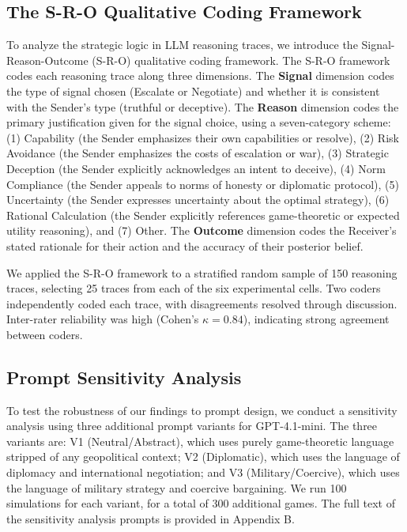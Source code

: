 \documentclass[12pt]{article}
\theoremstyle{plain}
\theoremstyle{definition}
\begin{document}
\subsection{The S-R-O Qualitative Coding Framework}

To analyze the strategic logic in LLM reasoning traces, we introduce the Signal-Reason-Outcome (S-R-O) qualitative coding framework. The S-R-O framework codes each reasoning trace along three dimensions. The \textbf{Signal} dimension codes the type of signal chosen (Escalate or Negotiate) and whether it is consistent with the Sender's type (truthful or deceptive). The \textbf{Reason} dimension codes the primary justification given for the signal choice, using a seven-category scheme: (1) Capability (the Sender emphasizes their own capabilities or resolve), (2) Risk Avoidance (the Sender emphasizes the costs of escalation or war), (3) Strategic Deception (the Sender explicitly acknowledges an intent to deceive), (4) Norm Compliance (the Sender appeals to norms of honesty or diplomatic protocol), (5) Uncertainty (the Sender expresses uncertainty about the optimal strategy), (6) Rational Calculation (the Sender explicitly references game-theoretic or expected utility reasoning), and (7) Other. The \textbf{Outcome} dimension codes the Receiver's stated rationale for their action and the accuracy of their posterior belief.

We applied the S-R-O framework to a stratified random sample of 150 reasoning traces, selecting 25 traces from each of the six experimental cells. Two coders independently coded each trace, with disagreements resolved through discussion. Inter-rater reliability was high (Cohen's $\kappa = 0.84$), indicating strong agreement between coders.

\subsection{Prompt Sensitivity Analysis}

To test the robustness of our findings to prompt design, we conduct a sensitivity analysis using three additional prompt variants for GPT-4.1-mini. The three variants are: V1 (Neutral/Abstract), which uses purely game-theoretic language stripped of any geopolitical context; V2 (Diplomatic), which uses the language of diplomacy and international negotiation; and V3 (Military/Coercive), which uses the language of military strategy and coercive bargaining. We run 100 simulations for each variant, for a total of 300 additional games. The full text of the sensitivity analysis prompts is provided in Appendix B.
\end{document}
